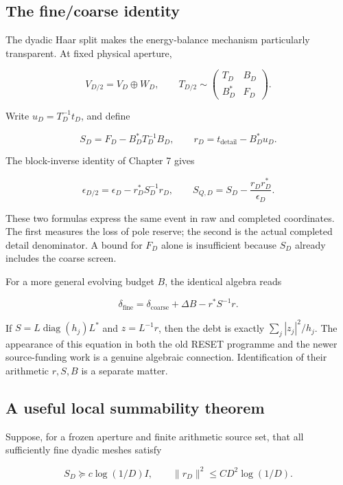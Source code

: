 \documentclass[
  10pt,
  a4paper,
  10pt,
  oneside,
  openany]{book}
\begin{document}
\subsection{The fine/coarse identity}\label{the-finecoarse-identity}

The dyadic Haar split makes the energy-balance mechanism particularly
transparent. At fixed physical aperture,

\[
 V_{D/2}=V_D\oplus W_D,
 \qquad
 T_{D/2}\sim\begin{pmatrix}T_D&B_D\\B_D^{*}&F_D\end{pmatrix}.
\]

Write \(u_D=T_D^{-1}t_D\), and define

\[
 S_D=F_D-B_D^{*}T_D^{-1}B_D,
 \qquad r_D=t_{\mathrm{detail}}-B_D^{*}u_D.
\]

The block-inverse identity of Chapter 7 gives

\[
 \epsilon_{D/2}=\epsilon_D-r_D^{*}S_D^{-1}r_D,
 \qquad
 S_{Q,D}=S_D-\frac{r_Dr_D^{*}}{\epsilon_D}.
 \tag{40.1}\label{eq:40.1}
\]

These two formulas express the same event in raw and completed
coordinates. The first measures the loss of pole reserve; the second is
the actual completed detail denominator. A bound for \(F_D\) alone is
insufficient because \(S_D\) already includes the coarse screen.

For a more general evolving budget \(B\), the identical algebra reads

\[
 \delta_{\mathrm{fine}}
 =\delta_{\mathrm{coarse}}+\Delta B-r^{*}S^{-1}r.
 \tag{40.2}\label{eq:40.2}
\]

If \(S=L\operatorname{diag}(h_j)L^{*}\) and \(z=L^{-1}r\), then the debt
is exactly \(\sum_j|z_j|^2/h_j\). The appearance of this equation in
both the old RESET programme and the newer source-funding work is a
genuine algebraic connection. Identification of their arithmetic
\(r,S,B\) is a separate matter.

\subsection{A useful local summability
theorem}\label{a-useful-local-summability-theorem}

Suppose, for a frozen aperture and finite arithmetic source set, that
all sufficiently fine dyadic meshes satisfy

\[
 S_D\succeq c\log(1/D)I,
 \qquad \|r_D\|^2\le C D^2\log(1/D).
 \tag{40.3}\label{eq:40.3}
\]
\end{document}
